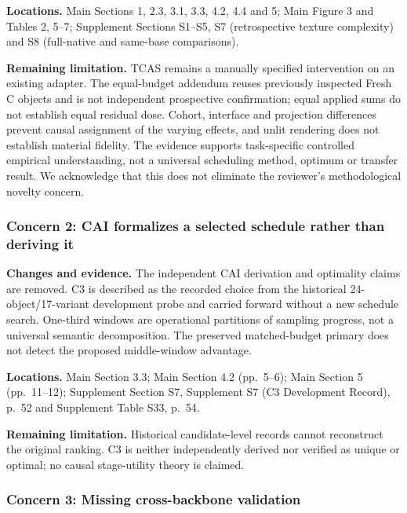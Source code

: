 \documentclass[
  10pt,
]{article}
\begin{document}
\textbf{Locations.} Main Sections 1, 2.3, 3.1, 3.3, 4.2, 4.4 and 5; Main
Figure 3 and Tables 2, 5--7; Supplement Sections S1--S5, S7
(retrospective texture complexity) and S8 (full-native and same-base
comparisons).

\textbf{Remaining limitation.} TCAS remains a manually specified
intervention on an existing adapter. The equal-budget addendum reuses
previously inspected Fresh C objects and is not independent prospective
confirmation; equal applied sums do not establish equal residual dose.
Cohort, interface and projection differences prevent causal assignment
of the varying effects, and unlit rendering does not establish material
fidelity. The evidence supports task-specific controlled empirical
understanding, not a universal scheduling method, optimum or transfer
result. We acknowledge that this does not eliminate the reviewer's
methodological novelty concern.

\hypertarget{concern-2-cai-formalizes-a-selected-schedule-rather-than-deriving-it}{%
\subsubsection{Concern 2: CAI formalizes a selected schedule rather than
deriving
it}\label{concern-2-cai-formalizes-a-selected-schedule-rather-than-deriving-it}}

\textbf{Changes and evidence.} The independent CAI derivation and
optimality claims are removed. C3 is described as the recorded choice
from the historical 24-object/17-variant development probe and carried
forward without a new schedule search. One-third windows are operational
partitions of sampling progress, not a universal semantic decomposition.
The preserved matched-budget primary does not detect the proposed
middle-window advantage.

\textbf{Locations.} Main Section 3.3; Main Section 4.2 (pp.~5--6); Main
Section 5 (pp.~11--12); Supplement Section S7, Supplement S7 (C3
Development Record), p.~52 and Supplement Table S33, p.~54.

\textbf{Remaining limitation.} Historical candidate-level records cannot
reconstruct the original ranking. C3 is neither independently derived
nor verified as unique or optimal; no causal stage-utility theory is
claimed.

\hypertarget{concern-3-missing-cross-backbone-validation}{%
\subsubsection{Concern 3: Missing cross-backbone
validation}\label{concern-3-missing-cross-backbone-validation}}
\end{document}
